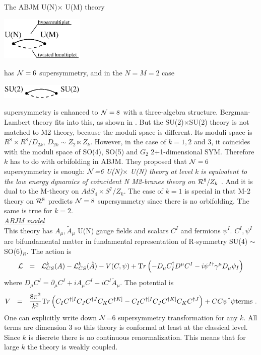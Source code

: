 \documentclass[12pt]{article}
\def\be{\begin{eqnarray}}\def\ba{\begin{eqnarray}}
\def\ee{\end{eqnarray}}\def\ea{\end{eqnarray}}
\def\calL{{\cal L}}\def\calF{{\cal F}}
\def\calN{{\cal N}}
\def\Tr{{\mathrm Tr}}
\begin{document}
The ABJM U(N)$\times$ U(M) theory 
\begin{center}
\includegraphics[width=4.0cm]{abjm_u.eps}
\end{center}
has $\calN =6 $ supersymmetry, and in the $N=M=2$ case 
\begin{center}
\includegraphics[width=4.0cm]{abjm_su.eps}
\end{center}
supersymmetry is enhanced to $\calN=8 $ with a three-algebra structure. 
Bergman-Lambert theory \cite{BL} fits into this, as shown in \cite{HL3P}.
But the SU(2)$\times$SU(2) theory is not matched to M2 theory, because the moduli space is different. 
Its moduli space is $R^8 \times R^8 /D_{2k}$, $D_{2k} \sim Z_2 \ltimes Z_k$. 
However, in the case of $ k = 1,2 $ and $3 $, it coincides with the moduli space of SO(4), SO(5) and $ G_2 $ 2+1-dimensional SYM.
Therefore $ k $ has to do with orbifolding in ABJM.
They proposed that $ \mathcal{N}= 6 $ supersymmetry is enough:
{\it $\calN$=6  U(N)$\times$ U(N) theory at level k is equivalent to the low energy dynamics of coincident N M2-branes theory on $\mathcal{R}^8/Z_k$} \cite{ABJM}. 
And it is dual to the M-theory on $AdS_4 \times S^7 /Z_k$.
The case of $k=1 $ is special in that M-2 theory on $ \mathcal{R}^8 $ predicts $ \mathcal{N}=8 $ supersymmetry since there is no orbifolding.
The same is true for $ k = 2 $.\\

\noindent\underline{\large \it ABJM model}\\
This theory has $A_\mu, \tilde{A}_\mu$ U(N) gauge fields and scalars $C^I$  and fermions $\psi^I$.  
$C^I, \psi^I$ are bifundamental matter in fundamental representation of R-symmetry SU(4) $\sim$ SO(6)$_R$. 
The action is
\be
\calL ~~=~~ \calL_{CS}^k(A)- \calL_{CS}^k(\tilde{A}) -V(C, \psi) + {\mathrm Tr}\left(-D_\mu C_I^\dagger D^\mu C^I - i \psi^{I \dagger}\gamma^\mu D_\mu \psi_I \right)
\ee
where $D_\mu C^I = \partial_\mu C^I + i A_\mu C^I - i C^I \tilde{A}_\mu$.  
The potential is
\be \label{ABJMpot}
V ~~=~~ \frac{8 \pi^2}{k^2}\Tr \left(C_I C^{\dagger[I}C_JC^{\dagger J}C_KC^{\dagger K]} - C_I C^{\dagger [I}C_J C^{\dagger K]}C_K C^{\dagger J} \right) + CC\psi^\dagger\psi {\rm terms}~.
\ee
One can explicitly write down  $\calN$=6 supersymmetry transformation for any $k$. 
All terms are dimension 3 so this theory is conformal at least at the classical level.
Since $k$ is discrete there is no continuous renormalization. 
This means that for large $k$ the theory is weakly coupled.
\end{document}
